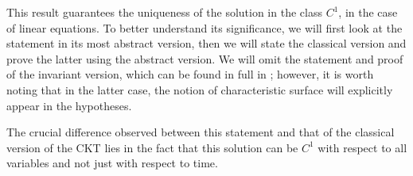 This result guarantees the uniqueness of the solution in the class $C^1$, in the case of linear equations. To better understand its significance, we will first look at the statement in its most abstract version, then we will state the classical version and prove the latter using the abstract version. We will omit the statement and proof of the invariant version, which can be found in full in \cite[cap.21]{Treves}; however, it is worth noting that in the latter case, the notion of characteristic surface will explicitly appear in the hypotheses.

\begin{theorem}
\end{theorem}

\begin{theorem}
\end{theorem}

\begin{remark}
The crucial difference observed between this statement and that of the classical version of the CKT lies in the fact that this solution can be $C^1$ with respect to all variables and not just with respect to time.
\end{remark}

